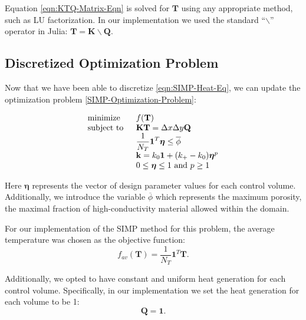 Equation \eqref{eqn:KTQ-Matrix-Eqn} is solved for $\mathbf{T}$ using any appropriate method, such as LU factorization. In our implementation we used the standard ``$\backslash$'' operator in Julia: $\mathbf{T}=\mathbf{K}\backslash\mathbf{Q}$.

\subsection{Discretized Optimization Problem}

Now that we have been able to discretize \eqref{eqn:SIMP-Heat-Eq}, we can update the optimization problem \eqref{SIMP-Optimization-Problem}:

\begin{equation}
	\begin{tabular}{ll}
		\text{minimize }   & $f(\mathbf{T})$                                                                                     \\
		\text{subject to } & $\mathbf{K}\mathbf{T}=\Delta x\Delta y\mathbf{Q}$                                                                   \\
		                   & $\displaystyle\frac{1}{N_T}\mathbf{1}^T\boldsymbol{\eta}\leq\overline{\phi}$ \\
		                   & $\mathbf{k}=k_0\mathbf{1}+(k_+-k_0)\boldsymbol{\eta}^p$                                       \\
		                   & $0\leq\boldsymbol{\eta}\leq 1\text{ and } p\geq 1$
	\end{tabular}\label{Discretized-SIMP-Optimization-Problem}
\end{equation}

Here $\boldsymbol{\eta}$ represents the vector of design parameter values for each control volume. Additionally, we introduce the variable $\overline{\phi}$ which represents the maximum porosity, the maximal fraction of high-conductivity material allowed within the domain.

For our implementation of the SIMP method for this problem, the average temperature was chosen as the objective function:
\begin{equation}
	f_{av}\left(\mathbf{T}\right)=\frac{1}{N_T}\mathbf{1}^T\mathbf{T}.\label{eqn:f_av}
\end{equation}

Additionally, we opted to have constant and uniform heat generation for each control volume. Specifically, in our implementation we set the heat generation for each volume to be 1:
\begin{equation}
	\mathbf{Q}=\mathbf{1}.\label{eqn:Q_vec}
\end{equation}

